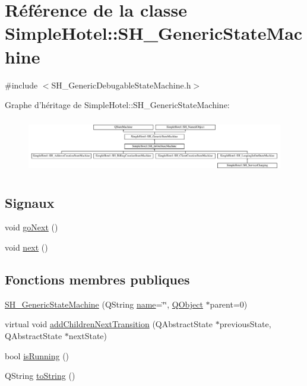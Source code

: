 \hypertarget{classSimpleHotel_1_1SH__GenericStateMachine}{\section{Référence de la classe Simple\-Hotel\-:\-:S\-H\-\_\-\-Generic\-State\-Machine}
\label{classSimpleHotel_1_1SH__GenericStateMachine}
}


{\ttfamily \#include $<$S\-H\-\_\-\-Generic\-Debugable\-State\-Machine.\-h$>$}

Graphe d'héritage de Simple\-Hotel\-:\-:S\-H\-\_\-\-Generic\-State\-Machine\-:\begin{figure}[H]
\begin{center}
\leavevmode
\includegraphics[height=2.430556cm]{classSimpleHotel_1_1SH__GenericStateMachine}
\end{center}
\end{figure}
\subsection*{Signaux}
\begin{DoxyCompactItemize}
\item 
void \hyperlink{classSimpleHotel_1_1SH__GenericStateMachine_a1c0cc74f8134d2029b0cc8a2a929023d}{go\-Next} ()
\item 
void \hyperlink{classSimpleHotel_1_1SH__GenericStateMachine_a2de14d4920ae8c10b70c2d73fc2d4a93}{next} ()
\end{DoxyCompactItemize}
\subsection*{Fonctions membres publiques}
\begin{DoxyCompactItemize}
\item 
\hyperlink{classSimpleHotel_1_1SH__GenericStateMachine_a0943c733abdbe70ea78f9e1f90a26154}{S\-H\-\_\-\-Generic\-State\-Machine} (Q\-String \hyperlink{classSimpleHotel_1_1SH__NamedObject_ad144716345034c91cface8f3163a799e}{name}=\char`\"{}\char`\"{}, \hyperlink{classQObject}{Q\-Object} $\ast$parent=0)
\item 
virtual void \hyperlink{classSimpleHotel_1_1SH__GenericStateMachine_a3771c91002bec6ab9414703251cc7825}{add\-Children\-Next\-Transition} (Q\-Abstract\-State $\ast$previous\-State, Q\-Abstract\-State $\ast$next\-State)
\item 
bool \hyperlink{classSimpleHotel_1_1SH__GenericStateMachine_a23d9e26143a6732fa5a8f540eb827e03}{is\-Running} ()
\item 
Q\-String \hyperlink{classSimpleHotel_1_1SH__GenericStateMachine_ad6dd1d0986c40684410ed94f1f610b12}{to\-String} ()
\end{DoxyCompactItemize}
